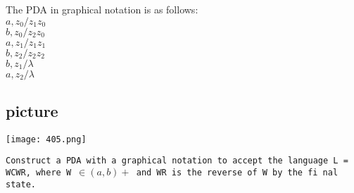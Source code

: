 \documentclass[9pt]{beamer}
\begin{document}
\begin{frame}
\hspace*{0.5cm} The PDA in graphical notation is as follows:\\

\hspace*{4cm} $a, z_0/z_1z_0$ \\
\hspace*{4cm} $b, z_0/z_2z_0$ \\
\hspace*{4cm} $a, z_1/ z_1z_1$ \\
\hspace*{4cm} $b, z_2/z_2z_2$ \\
\hspace*{4cm} $b, z_1/\lambda$ \\
\hspace*{4cm} $a, z_2/\lambda$ \\


\begin{center}
\section{picture}
\texttt{[image: 405.png]}
\end{center}

\hspace*{0.1cm} \texttt{\small{Construct a PDA with a graphical notation to accept the language L = {WCWR, where
W $\in (a, b)+$ and WR is the reverse of W} by the fi nal state.}} \\

\end{frame}
\end{document}
